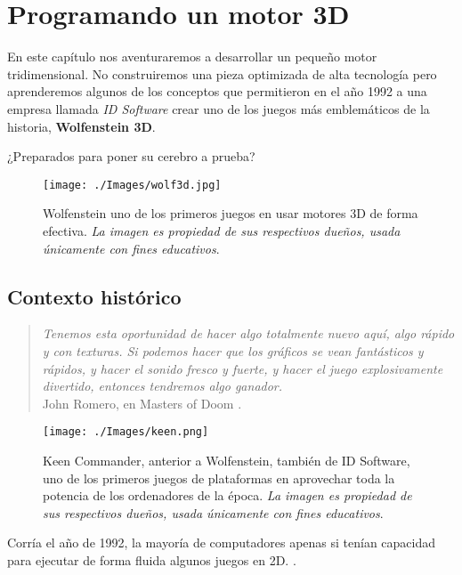 \chapter{Programando un motor 3D}

En este capítulo nos aventuraremos a desarrollar un pequeño motor tridimensional. No construiremos una pieza optimizada de alta tecnología pero aprenderemos algunos de los conceptos que permitieron en el año 1992 a una empresa llamada \emph{ID Software} crear uno de los juegos más emblemáticos de la historia, \textbf{Wolfenstein 3D}.

¿Preparados para poner su cerebro a prueba?

\begin{figure}[h!]
	\centering
	\texttt{[image: ./Images/wolf3d.jpg]}
	\caption{Wolfenstein uno de los primeros juegos en usar motores 3D de forma efectiva. \emph{La imagen es propiedad de sus respectivos dueños, usada únicamente con fines educativos}.}
	\label{wolf3d}
\end{figure}

\section{Contexto histórico}

\begin{quote}
	\emph{Tenemos esta oportunidad de hacer algo totalmente nuevo aquí, algo rápido y con texturas. Si podemos hacer que los gráficos se vean fantásticos y rápidos, y hacer el sonido fresco y fuerte, y hacer el juego explosivamente divertido, entonces tendremos algo ganador.} \\
	John Romero, en Masters of Doom \cite[p.~92]{doom}.
\end{quote}


\begin{figure}[h!]
	\centering
	\texttt{[image: ./Images/keen.png]}
	\caption{Keen Commander, anterior a Wolfenstein, también de ID Software, uno de los primeros juegos de plataformas en aprovechar toda la potencia de los ordenadores de la época. \emph{La imagen es propiedad de sus respectivos dueños, usada únicamente con fines educativos}.}
	\label{keen}
\end{figure}

Corría el año de 1992, la mayoría de computadores apenas si tenían capacidad para ejecutar de forma fluida algunos juegos en 2D. \emph{}.


